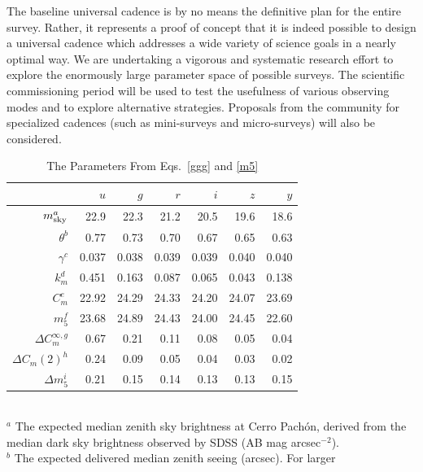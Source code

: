 The baseline universal cadence is by no means the definitive plan for the entire
survey. Rather, it represents a proof of concept that it is indeed possible to
design a universal cadence which addresses a wide variety of science goals in a nearly
optimal way. We are undertaking a vigorous and systematic research effort to explore
the enormously large parameter space of possible surveys. The
scientific commissioning period
will be used to test the usefulness of various observing modes and to explore
alternative strategies. Proposals from the community
for specialized cadences (such as mini-surveys and
micro-surveys) will also be considered.



\begin{table}
\caption{The Parameters From Eqs.~\ref{ggg} and \ref{m5}}
\begin{tabular}{|r|r|r|r|r|r|r|}
\hline
                           &   $u$  &   $g$   & $r$   &  $i$  & $z$  & $y$  \\
\hline
   $m_{\rm sky}^a$ &   22.9    & 22.3    & 21.2    & 20.5    & 19.6    &  18.6  \\
   $\theta^b$       &   0.77     &  0.73     & 0.70    & 0.67    &  0.65   &  0.63  \\
   $\gamma^c$   &   0.037   & 0.038    & 0.039   & 0.039   & 0.040   & 0.040 \\
    $k_m^d$        &    0.451  &  0.163   &  0.087  &  0.065   &  0.043   &  0.138 \\
    $C_m^e$        &   22.92   & 24.29    & 24.33   & 24.20   & 24.07   & 23.69 \\
    $m_5^f$         &   23.68     &   24.89    & 24.43     &  24.00   & 24.45    & 22.60  \\
 $\Delta C^{\infty,g}_m$  &  0.67   &  0.21     &  0.11   &  0.08   &   0.05  &  0.04  \\
 $\Delta C_m(2)^h$       &  0.24   &  0.09     &   0.05  &  0.04   &   0.03  &  0.02 \\
   $\Delta m_5^i$ &   0.21    & 0.15   & 0.14     &  0.13   & 0.13    & 0.15  \\
\hline
\end{tabular}
  \\ \vskip 0.05in
  $^a$ The expected median zenith sky brightness at Cerro Pach\'on, derived from
           the median dark sky brightness observed by SDSS (AB mag arcsec$^{-2}$). \\
  $^b$ The expected delivered median zenith seeing (arcsec). For larger

\end{table}
